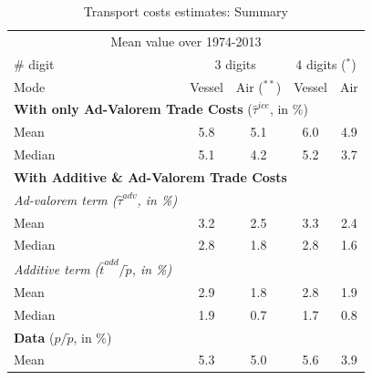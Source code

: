 \documentclass[a4paper,11pt]{article}
\begin{document}
\begin{table}[htbp]
  \centering
  \footnotesize{
  \caption{Transport costs estimates: Summary \label{tab:summary_results}}
  \begin{center}
    \begin{tabular}{l|cc|cc}
      \hline \hline
    \multicolumn{5}{c}{Mean value over 1974-2013}   \\
    \# digit & \multicolumn{2}{c}{3 digits} & \multicolumn{2}{c}{4 digits ($^\ast$)} \\ \hline
    Mode  & Vessel & Air ($^{\ast \ast}$) & Vessel & Air \\ \hline
    \multicolumn{5}{l}{\textbf{With only Ad-Valorem Trade Costs} ($\widehat{\tau}^{ice}$, in \%)}  \\ \hline
    Mean  & 5.8 & 5.1 & 6.0 & 4.9 \\
    Median & 5.1 & 4.2 & 5.2 & 3.7 \\ \hline
    \multicolumn{5}{l}{\textbf{With Additive \& Ad-Valorem Trade Costs} } \\ \hline
   \textit{Ad-valorem term ($\widehat{\tau}^{adv}$, in \%)} & & & & \\ \hline
    Mean  & 3.2 & 2.5 & 3.3 & 2.4 \\
    Median & 2.8 & 1.8 & 2.8 & 1.6 \\ \hline
    \textit{Additive term ($\widehat{t}^{add}/\widetilde{p}$, in \%)}& & & &   \\ \hline
    Mean  & 2.9 & 1.8 & 2.8 & 1.9 \\
    Median & 1.9 & 0.7 & 1.7 & 0.8 \\ \hline
    \multicolumn{5}{l}{\textbf{Data} ($p/\widetilde{p}$, in \%) } \\ \hline
        Mean & 5.3 & 5.0& 5.6&3.9 \\

\end{tabular}
\end{center}}
\end{table}
\end{document}
